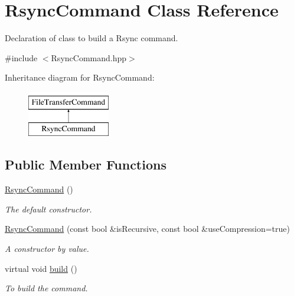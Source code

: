 \hypertarget{classRsyncCommand}{
\section{RsyncCommand Class Reference}
\label{classRsyncCommand}
}


Declaration of class to build a Rsync command.  




{\ttfamily \#include $<$RsyncCommand.hpp$>$}

Inheritance diagram for RsyncCommand:\begin{figure}[H]
\begin{center}
\leavevmode
\includegraphics[height=2.000000cm]{classRsyncCommand}
\end{center}
\end{figure}
\subsection*{Public Member Functions}
\begin{DoxyCompactItemize}
\item 
\hypertarget{classRsyncCommand_a84f8f5ea5aec48918aa8f92a6002e757}{
\hyperlink{classRsyncCommand_a84f8f5ea5aec48918aa8f92a6002e757}{RsyncCommand} ()}
\label{classRsyncCommand_a84f8f5ea5aec48918aa8f92a6002e757}

\begin{DoxyCompactList}\small\item\em The default constructor. \item\end{DoxyCompactList}\item 
\hyperlink{classRsyncCommand_ae4dcd193942f99e3d85593d777bd1073}{RsyncCommand} (const bool \&isRecursive, const bool \&useCompression=true)
\begin{DoxyCompactList}\small\item\em A constructor by value. \item\end{DoxyCompactList}\item 
\hypertarget{classRsyncCommand_ac5a71b71a69cf1ce4b407b5ac93d052a}{
virtual void \hyperlink{classRsyncCommand_ac5a71b71a69cf1ce4b407b5ac93d052a}{build} ()}
\label{classRsyncCommand_ac5a71b71a69cf1ce4b407b5ac93d052a}

\begin{DoxyCompactList}\small\item\em To build the command. \item\end{DoxyCompactList}\end{DoxyCompactItemize}



